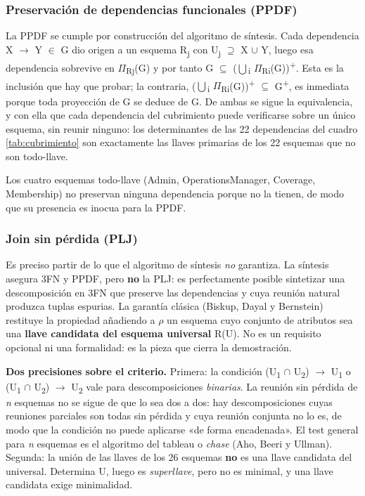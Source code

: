 \documentclass[11pt,a4paper]{article}
\begin{document}
\subsubsection{Preservación de dependencias funcionales (PPDF)}
La PPDF se cumple por construcción del algoritmo de síntesis. Cada dependencia X \ensuremath{\rightarrow} Y \ensuremath{\in} G dio origen a un esquema R\textsubscript{j} con U\textsubscript{j} \ensuremath{\supseteq} X \ensuremath{\cup} Y, luego esa dependencia sobrevive en \ensuremath{\Pi}\textsubscript{Rj}(G) y por tanto G \ensuremath{\subseteq} (\ensuremath{\bigcup}\textsubscript{i} \ensuremath{\Pi}\textsubscript{Ri}(G))\textsuperscript{+}. Esta es la inclusión que hay que probar; la contraria, (\ensuremath{\bigcup}\textsubscript{i} \ensuremath{\Pi}\textsubscript{Ri}(G))\textsuperscript{+} \ensuremath{\subseteq} G\textsuperscript{+}, es inmediata porque toda proyección de G se deduce de G. De ambas se sigue la equivalencia, y con ella que cada dependencia del cubrimiento puede verificarse sobre un único esquema, sin reunir ninguno: los determinantes de las 22 dependencias del cuadro \ref{tab:cubrimiento} son exactamente las llaves primarias de los 22 esquemas que no son todo-llave.

Los cuatro esquemas todo-llave (Admin, OperationsManager, Coverage, Membership) no preservan ninguna dependencia porque no la tienen, de modo que su presencia es inocua para la PPDF.

\subsubsection{Join sin pérdida (PLJ)}
Es preciso partir de lo que el algoritmo de síntesis \textit{no} garantiza. La síntesis asegura 3FN y PPDF, pero \textbf{no} la PLJ: es perfectamente posible sintetizar una descomposición en 3FN que preserve las dependencias y cuya reunión natural produzca tuplas espurias. La garantía clásica (Biskup, Dayal y Bernstein) restituye la propiedad añadiendo a \ensuremath{\rho} un esquema cuyo conjunto de atributos sea una \textbf{llave candidata del esquema universal} R(U). No es un requisito opcional ni una formalidad: es la pieza que cierra la demostración.

\textbf{Dos precisiones sobre el criterio.} Primera: la condición (U\textsubscript{1} \ensuremath{\cap} U\textsubscript{2}) \ensuremath{\rightarrow} U\textsubscript{1} o (U\textsubscript{1} \ensuremath{\cap} U\textsubscript{2}) \ensuremath{\rightarrow} U\textsubscript{2} vale para descomposiciones \textit{binarias}. La reunión sin pérdida de \textit{n} esquemas no se sigue de que lo sea dos a dos: hay descomposiciones cuyas reuniones parciales son todas sin pérdida y cuya reunión conjunta no lo es, de modo que la condición no puede aplicarse «de forma encadenada». El test general para \textit{n} esquemas es el algoritmo del tableau o \textit{chase} (Aho, Beeri y Ullman). Segunda: la unión de las llaves de los 26 esquemas \textbf{no} es una llave candidata del universal. Determina U, luego es \textit{superllave}, pero no es minimal, y una llave candidata exige minimalidad.
\end{document}
